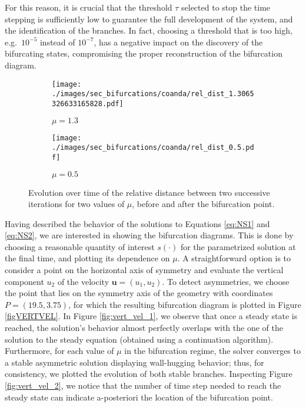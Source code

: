 \documentclass[reqno]{amsart}[standalone]
\theoremstyle{definition}
\theoremstyle{remark}
\newcommand{\bs}{\boldsymbol}
\begin{document}
For this reason, it is crucial that the threshold $\tau$ selected to stop the time stepping is sufficiently low to guarantee the full development of the system, and the identification of the branches.
In fact, choosing a threshold that is too high, e.g.\ $10^{-5}$ instead of $10^{-7}$, has a negative impact on the discovery of the bifurcating  states, compromising the proper reconstruction of the bifurcation diagram.

%


\begin{figure}
\begin{subfigure}{0.45\linewidth}
\centering
\texttt{[image: ./images/sec\_bifurcations/coanda/rel\_dist\_1.3065326633165828.pdf]}
\caption{$\mu=1.3$}
\end{subfigure}
\hspace{0.6cm}
\begin{subfigure}{0.45\linewidth}
\centering
\texttt{[image: ./images/sec\_bifurcations/coanda/rel\_dist\_0.5.pdf]}
\caption{$\mu=0.5$}
\end{subfigure}
\caption{Evolution over time of the relative distance between two successive iterations for two values of $\mu$, before and after the bifurcation point.}
    \label{figRELDIST}
\end{figure}

Having described the behavior of the solutions to Equations \eqref{eq:NS1} and \eqref{eq:NS2}, we are interested in showing the bifurcation diagrams.
This is done by choosing a reasonable quantity of interest $s(\cdot)$ for the parametrized solution at the final time, and plotting its dependence on $\mu$.
A straightforward option is to consider a point on the horizontal axis of symmetry and evaluate the vertical component $u_2$ of the velocity $\bs{u}=(u_1, u_2)$.
To detect asymmetries, we choose the point that lies on the symmetry axis of the geometry with coordinates $P=(19.5, 3.75)$, for which the resulting bifurcation diagram is plotted in Figure \ref{figVERTVEL}.
In Figure \ref{fig:vert_vel_1}, we observe that once a steady state is reached, the solution's behavior almost perfectly overlaps with the one of the solution to the steady equation (obtained using a continuation algorithm).
Furthermore, for each value of $\mu$ in the bifurcation regime, the solver converges to a stable asymmetric solution displaying wall-hugging behavior; thus, for consistency, we plotted the evolution of both stable branches.
%
%
Inspecting Figure \ref{fig:vert_vel_2}, we notice that the number of time step needed to reach the steady state can indicate a-posteriori the location of the bifurcation point.
\end{document}

